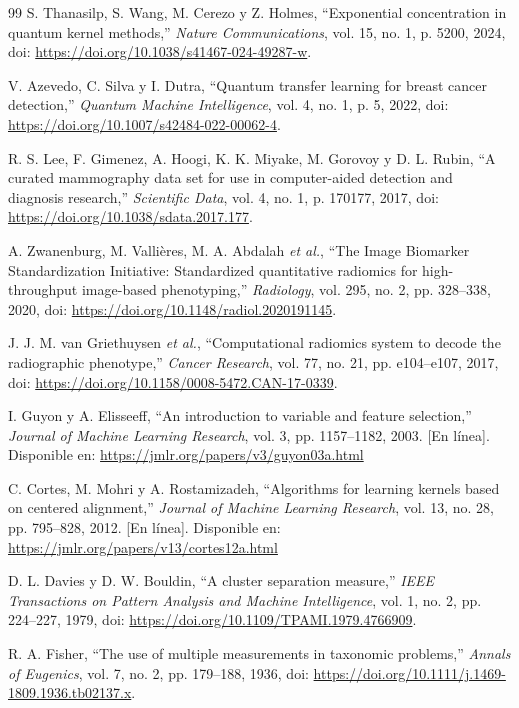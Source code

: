 \documentclass[conference,letterpaper]{IEEEtran}
\begin{document}
\begin{thebibliography}{99}
S. Thanasilp, S. Wang, M. Cerezo y Z. Holmes, ``Exponential concentration in quantum kernel methods,'' \textit{Nature Communications}, vol. 15, no. 1, p. 5200, 2024, doi: \url{https://doi.org/10.1038/s41467-024-49287-w}.

V. Azevedo, C. Silva y I. Dutra, ``Quantum transfer learning for breast cancer detection,'' \textit{Quantum Machine Intelligence}, vol. 4, no. 1, p. 5, 2022, doi: \url{https://doi.org/10.1007/s42484-022-00062-4}.

R. S. Lee, F. Gimenez, A. Hoogi, K. K. Miyake, M. Gorovoy y D. L. Rubin, ``A curated mammography data set for use in computer-aided detection and diagnosis research,'' \textit{Scientific Data}, vol. 4, no. 1, p. 170177, 2017, doi: \url{https://doi.org/10.1038/sdata.2017.177}.

A. Zwanenburg, M. Valli\`eres, M. A. Abdalah \textit{et al.}, ``The Image Biomarker Standardization Initiative: Standardized quantitative radiomics for high-throughput image-based phenotyping,'' \textit{Radiology}, vol. 295, no. 2, pp. 328--338, 2020, doi: \url{https://doi.org/10.1148/radiol.2020191145}.

J. J. M. van Griethuysen \textit{et al.}, ``Computational radiomics system to decode the radiographic phenotype,'' \textit{Cancer Research}, vol. 77, no. 21, pp. e104--e107, 2017, doi: \url{https://doi.org/10.1158/0008-5472.CAN-17-0339}.

I. Guyon y A. Elisseeff, ``An introduction to variable and feature selection,'' \textit{Journal of Machine Learning Research}, vol. 3, pp. 1157--1182, 2003. [En línea]. Disponible en: \url{https://jmlr.org/papers/v3/guyon03a.html}

C. Cortes, M. Mohri y A. Rostamizadeh, ``Algorithms for learning kernels based on centered alignment,'' \textit{Journal of Machine Learning Research}, vol. 13, no. 28, pp. 795--828, 2012. [En línea]. Disponible en: \url{https://jmlr.org/papers/v13/cortes12a.html}

D. L. Davies y D. W. Bouldin, ``A cluster separation measure,'' \textit{IEEE Transactions on Pattern Analysis and Machine Intelligence}, vol. 1, no. 2, pp. 224--227, 1979, doi: \url{https://doi.org/10.1109/TPAMI.1979.4766909}.

R. A. Fisher, ``The use of multiple measurements in taxonomic problems,'' \textit{Annals of Eugenics}, vol. 7, no. 2, pp. 179--188, 1936, doi: \url{https://doi.org/10.1111/j.1469-1809.1936.tb02137.x}.

\end{thebibliography}
\end{document}
